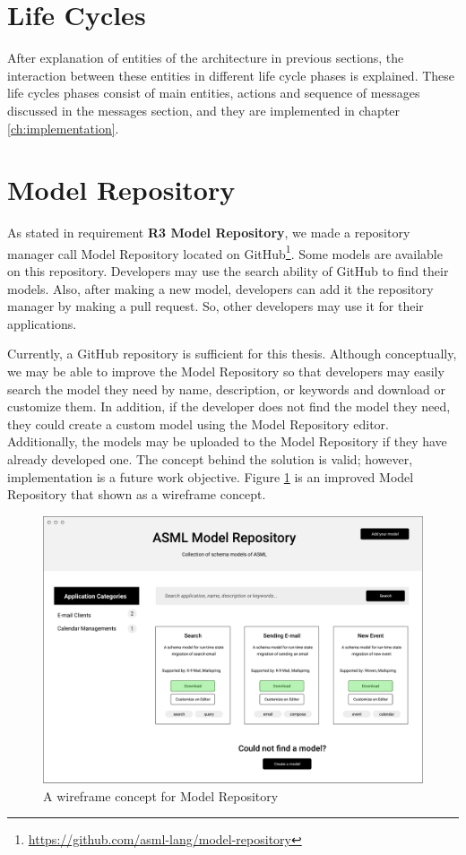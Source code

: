 \section{Life Cycles}
After explanation of entities of the architecture in previous sections, the interaction between these entities in different life cycle phases is explained. These life cycles phases consist of main entities, actions and sequence of messages discussed in the messages section, and they are implemented in chapter \ref{ch:implementation}. 



\section{Model Repository}

As stated in requirement \textbf{R3 Model Repository}, we made a repository manager call Model Repository located on GitHub\footnote{\url{https://github.com/asml-lang/model-repository}}. Some models are available on this repository. Developers may use the search ability of GitHub to find their models. Also, after making a new model, developers can add it the repository manager by making a pull request. So, other developers may use it for their applications.

Currently, a GitHub repository is sufficient for this thesis. Although conceptually, we may be able to improve the Model Repository so that developers may easily search the model they need by name, description, or keywords and download or customize them. In addition, if the developer does not find the model they need, they could create a custom model using the Model Repository editor. Additionally, the models may be uploaded to the Model Repository if they have already developed one. The concept behind the solution is valid; however, implementation is a future work objective. Figure \ref{fig:model-repo} is an improved Model Repository that shown as a wireframe concept.

\FloatBarrier
\begin{figure}[H]
    \includegraphics[width=\linewidth]{../figures/model-repo.pdf}
    \centering
    \caption{A wireframe concept for Model Repository}
    \label{fig:model-repo}
\end{figure}
\FloatBarrier